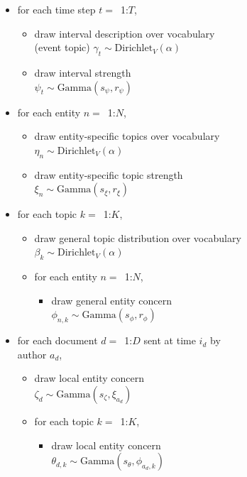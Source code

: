 \begin{figure}[!ht]
\begin{mdframed}[userdefinedwidth=3.0in,align=center]
\small
\begin{itemize}[leftmargin=*]
\item for each time step $t=$~1:$T$,
	\begin{itemize}[leftmargin=*]
	\item draw interval description over vocabulary \\
	(event topic) $\gamma_t \sim \mbox{Dirichlet}_V (\alpha)$
	\item draw interval strength \\$\psi_{t} \sim \mbox{Gamma}(s_\psi, r_\psi)$
	\end{itemize}
\item for each entity $n=$~1:$N$,
	\begin{itemize}[leftmargin=*]
	\item draw entity-specific topics over vocabulary \\$\eta_n \sim \mbox{Dirichlet}_V (\alpha)$
	\item draw entity-specific topic strength \\$\xi_{n} \sim \mbox{Gamma}(s_\xi, r_\xi)$
	\end{itemize}
\item for each topic $k=$~1:$K$,
	\begin{itemize}[leftmargin=*]
	\item draw general topic distribution over vocabulary $\beta_k \sim \mbox{Dirichlet}_V (\alpha)$
	\item for each entity $n=$~1:$N$,
		\begin{itemize}[leftmargin=*]
		\item draw general entity concern \\$\phi_{n,k} \sim \mbox{Gamma}(s_\phi, r_\phi)$
		\end{itemize}
	\end{itemize}
\item for each document $d=$~1:$D$ sent at time $i_d$ by\\author $a_d$,
	\begin{itemize}[leftmargin=*]
	\item draw local entity concern \\$\zeta_{d} \sim \mbox{Gamma}(s_\zeta, \xi_{a_d})$
	\item for each topic $k=$~1:$K$,
		\begin{itemize}[leftmargin=*]
			\item draw local entity concern \\$\theta_{d,k} \sim \mbox{Gamma}(s_\theta, \phi_{a_d,k})$

\end{itemize}
\end{itemize}
\end{itemize}
\end{mdframed}
\end{figure}
